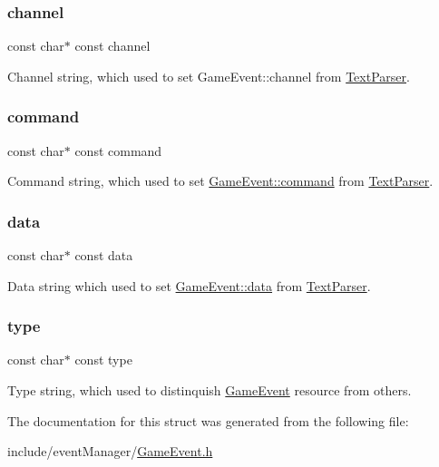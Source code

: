 \subsubsection{\texorpdfstring{channel}{channel}}
{\footnotesize\ttfamily const char$\ast$ const channel}

Channel string, which used to set Game\+Event\+::channel from \hyperlink{struct_text_parser}{Text\+Parser}. \hypertarget{struct_game_event__parser_strings_ac7eef288127bdf6b327ed1ff5c8ab5bb}{}\label{struct_game_event__parser_strings_ac7eef288127bdf6b327ed1ff5c8ab5bb} 
\subsubsection{\texorpdfstring{command}{command}}
{\footnotesize\ttfamily const char$\ast$ const command}

Command string, which used to set \hyperlink{struct_game_event_ade9cba72805fe52685a1deea307a8e82}{Game\+Event\+::command} from \hyperlink{struct_text_parser}{Text\+Parser}. \hypertarget{struct_game_event__parser_strings_ae62ff5b9a94eb24120cdac857594d217}{}\label{struct_game_event__parser_strings_ae62ff5b9a94eb24120cdac857594d217} 
\subsubsection{\texorpdfstring{data}{data}}
{\footnotesize\ttfamily const char$\ast$ const data}

Data string which used to set \hyperlink{struct_game_event_a91a70b77df95bd8b0830b49a094c2acb}{Game\+Event\+::data} from \hyperlink{struct_text_parser}{Text\+Parser}. \hypertarget{struct_game_event__parser_strings_a8ff938fb2f815be425fd2859a21e6d61}{}\label{struct_game_event__parser_strings_a8ff938fb2f815be425fd2859a21e6d61} 
\subsubsection{\texorpdfstring{type}{type}}
{\footnotesize\ttfamily const char$\ast$ const type}

Type string, which used to distinquish \hyperlink{struct_game_event}{Game\+Event} resource from others. 

The documentation for this struct was generated from the following file\+:\begin{DoxyCompactItemize}
\item 
include/event\+Manager/\hyperlink{_game_event_8h}{Game\+Event.\+h}\end{DoxyCompactItemize}
